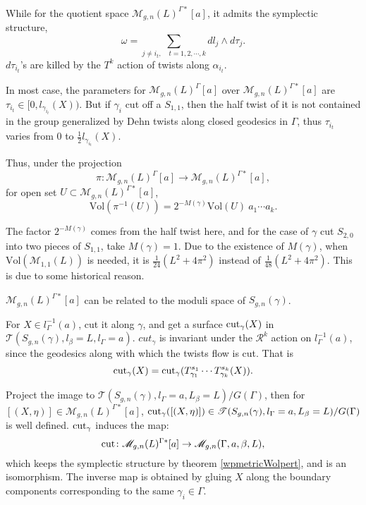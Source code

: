   While for the quotient space $\mathscr{M}_{g,n}(L)^{\Gamma*}[a]$, it admits the symplectic structure, $$\omega=\sum\limits_{j\neq i_t,\quad t=1,2,\cdots,k}dl_j\wedge d\tau_j.$$
 $d\tau_{i_t}$'s are  killed by the $T^k$ action of twists along $\alpha_{i_t}$.
 
 In most case, the parameters for $\mathscr{M}_{g,n}(L)^{\Gamma}[a]$ over $\mathscr{M}_{g,n}(L)^{\Gamma*}[a]$ are $\tau_{i_t}\in[0,l_{\gamma_{i_t}}(X))$. But if $\gamma_i$ cut off a $S_{1,1}$, then the half twist of it is not contained in the group generalized by Dehn twists along  closed geodesics in $\Gamma$, thus $\tau_{i_t}$ varies from $0$ to $\frac{1}{2}l_{\gamma_{i_t}}(X)$.
 
 Thus, under the projection $$\pi\colon\mathscr{M}_{g,n}(L)^{\Gamma}[a]\to \mathscr{M}_{g,n}(L)^{\Gamma*}[a],$$
 for open set $U\subset \mathscr{M}_{g,n}(L)^{\Gamma*}[a]$, 
 \begin{equation}\label{areaformula}
     \mathrm{Vol}(\pi^{-1}(U))=2^{-M(\gamma)}\mathrm{Vol}(U)\ a_1\cdots a_k.
 \end{equation}
 \begin{remark}
 The factor $2^{-M(\gamma)}$ comes from the half twist here, and for the case of $\gamma$ cut  $S_{2,0}$ into two pieces of $S_{1,1}$, take $M(\gamma)=1$. Due to the existence of $M(\gamma)$, when $\mathrm{Vol}(\mathscr{M}_{1,1}(L))$ is needed, it is $\frac{1}{24}(L^2+4\pi^2)$ instead of $\frac{1}{48}(L^2+4\pi^2)$. This is due to some historical reason. 
 \end{remark}
 $\mathscr{M}_{g,n}(L)^{\Gamma*}[a]$ can be  related  to the moduli space of $S_{g,n}(\gamma)$.
 
 For $X\in l_{\Gamma}^{-1}(a)$, cut it along $\gamma$, and get a surface $\operatorname{cut}_\gamma(X)$ in $\mathscr{T}(S_{g,n}(\gamma),l_\beta=L,l_\Gamma=a)$.
 $cut_{\gamma}$ is invariant under the $\mathscr{R}^k$ action on $l_{\Gamma}^{-1}(a)$, since the geodesics along with which the twists flow is cut. That is $$
 \operatorname{cut}_{\gamma}(X)=\operatorname{cut}_{\gamma}(T_{\gamma_1}^{s_1}\cdots T_{\gamma_k}^{s_k}(X)).
 $$
 
 Project the image to $\mathscr{T}(S_{g,n}(\gamma),l_{\Gamma}=a,L_\beta=L)/G(\Gamma)$, then for $[(X,\eta)]\in \mathscr{M}_{g,n}(L)^{\Gamma*}[a]$, $\operatorname{cut}_{\gamma}([(X,\eta)])\in\mathscr{T}(S_{g,n}(\gamma),l_{\Gamma}=a,L_\beta=L)/G(\Gamma)$ is well defined. $\operatorname{cut}_{\gamma}$ induces the map:
 $$
 \operatorname{cut}\colon\mathscr{M}_{g,n}(L)^{\Gamma*}[a]\to \mathscr{M}_{g,n}(\Gamma,a,\beta,L),
 $$
which keeps the symplectic structure by theorem \ref{wpmetricWolpert}, and is an isomorphism. The inverse map is obtained by gluing $X$ along the boundary components corresponding to the same $\gamma_i\in \Gamma$. 

